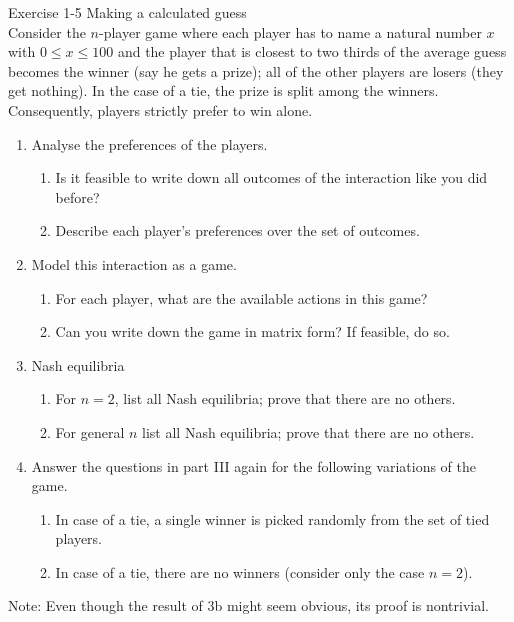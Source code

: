 \documentclass[../main.tex]{subfiles}
\begin{document}
\begin{question}
Exercise 1-5 Making a calculated guess\\
Consider the $n$-player game where each player has to name a natural number $x$ with $ 0 \leq x \leq 100$ and the player that is closest to two thirds of the average guess becomes the winner (say he gets a prize); all of the other players are losers (they get nothing). In the case of a tie, the prize is split among the winners. Consequently, players strictly prefer to win alone.\\

\begin{enumerate}
\item Analyse the preferences of the players.
	\begin{enumerate}
	\item Is it feasible to write down all outcomes of the interaction like you did before?
	\item Describe each player’s preferences over the set of outcomes.
	\end{enumerate}
\item Model this interaction as a game.
	\begin{enumerate}
	\item For each player, what are the available actions in this game?
	\item Can you write down the game in matrix form? If feasible, do so.
	\end{enumerate}
\item Nash equilibria
	\begin{enumerate}
	\item For $n = 2$, list all Nash equilibria; prove that there are no others.
	\item For general $n$ list all Nash equilibria; prove that there are no others.
	\end{enumerate}	
\item Answer the questions in part III again for the following variations of the game.
	\begin{enumerate}
	\item In case of a tie, a single winner is picked randomly from the set of tied players.
	\item In case of a tie, there are no winners (consider only the case $n=2$).
	\end{enumerate}	
\end{enumerate}
Note: Even though the result of 3b might seem obvious, its proof is nontrivial.
\end{question}
\end{document}
